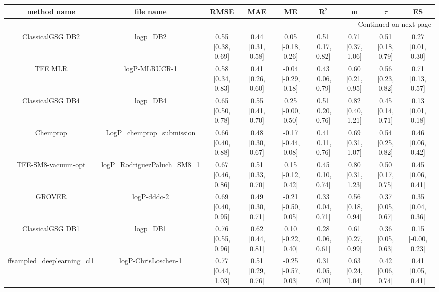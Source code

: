 \documentclass{article}
\begin{document}
\begin{center}
\scriptsize
\begin{longtable}{|ccccccccc|}
\toprule
                  method name &                                      file name &               RMSE &                MAE &                    ME &              R$^2$ &                     m &                $\tau$ &                    ES \\
\midrule
\endhead
\midrule
\multicolumn{9}{r}{{Continued on next page}} \\
\midrule
\endfoot

\bottomrule
\endlastfoot
             ClassicalGSG DB2 &                                      logp\_DB2 &  0.55 [0.38, 0.69] &  0.44 [0.31, 0.58] &    0.05 [-0.18, 0.26] &  0.51 [0.17, 0.82] &     0.71 [0.37, 1.06] &     0.51 [0.18, 0.79] &     0.27 [0.01, 0.30] \\
                      TFE MLR &                                  logP-MLRUCR-1 &  0.58 [0.34, 0.83] &  0.41 [0.26, 0.60] &   -0.04 [-0.29, 0.18] &  0.43 [0.06, 0.79] &     0.60 [0.21, 0.95] &     0.56 [0.23, 0.82] &     0.71 [0.13, 0.57] \\
             ClassicalGSG DB4 &                                      logp\_DB4 &  0.65 [0.50, 0.78] &  0.55 [0.41, 0.70] &    0.25 [-0.00, 0.50] &  0.51 [0.20, 0.76] &     0.82 [0.40, 1.21] &     0.45 [0.14, 0.71] &     0.13 [0.01, 0.18] \\
                     Chemprop &                     LogP\_chemprop\_submission &  0.66 [0.40, 0.88] &  0.48 [0.30, 0.67] &   -0.17 [-0.44, 0.08] &  0.41 [0.11, 0.76] &     0.69 [0.31, 1.07] &     0.54 [0.25, 0.82] &     0.46 [0.06, 0.42] \\
           TFE-SM8-vacuum-opt &                  logP\_RodriguezPaluch\_SM8\_1 &  0.67 [0.46, 0.86] &  0.51 [0.33, 0.70] &    0.15 [-0.12, 0.42] &  0.45 [0.10, 0.74] &     0.80 [0.31, 1.23] &     0.50 [0.17, 0.75] &     0.45 [0.06, 0.41] \\
                       GROVER &                                    logP-dddc-2 &  0.69 [0.40, 0.95] &  0.49 [0.30, 0.71] &   -0.21 [-0.50, 0.05] &  0.33 [0.04, 0.71] &     0.56 [0.18, 0.94] &     0.37 [0.05, 0.67] &     0.35 [0.04, 0.36] \\
             ClassicalGSG DB1 &                                      logp\_DB1 &  0.76 [0.55, 0.96] &  0.62 [0.44, 0.81] &    0.10 [-0.22, 0.40] &  0.28 [0.06, 0.61] &     0.61 [0.27, 0.99] &     0.36 [0.05, 0.63] &    0.15 [-0.00, 0.23] \\
   ffsampled_deeplearning_cl1 &                            logP-ChrisLoschen-1 &  0.77 [0.44, 1.03] &  0.51 [0.29, 0.76] &   -0.25 [-0.57, 0.03] &  0.31 [0.05, 0.70] &     0.63 [0.24, 1.04] &     0.42 [0.06, 0.74] &     0.41 [0.05, 0.41] \\

\end{longtable}
\end{center}
\end{document}
